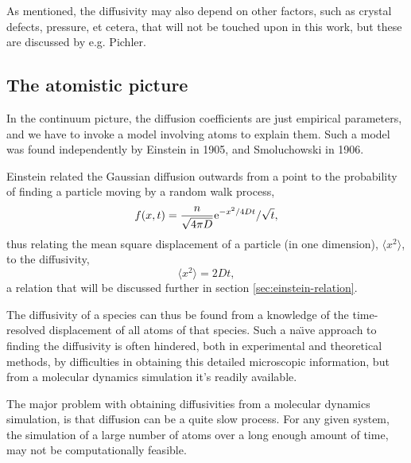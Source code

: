 \documentclass[11pt,bibliography=totoc,index=totoc]{scrbook}   %
\begin{document}
As mentioned, the diffusivity may also depend on other factors, such as crystal defects, pressure, et cetera, that will not be touched upon in this work, but these are discussed by e.g. Pichler.\cite{Pichler:2004}

%
\subsection{The atomistic picture}\label{sec:AtomisticPicture}
%

In the continuum picture, the diffusion coefficients are just empirical parameters, and we have to invoke a model involving atoms to explain them. 
Such a model was found independently by Einstein in 1905,\cite{Einstein:1905} and Smoluchowski in 1906.\cite{Smoluchowski:1906}

Einstein related the Gaussian diffusion outwards from a point to
the probability of finding a particle moving by a random walk process,
\begin{equation}
    f(x,t) = \frac{n}{\sqrt{4\pi D}} \mathrm{e}^{-x^2/4Dt} / \sqrt{t},
\end{equation}
thus relating the mean square displacement of a particle (in one dimension), $\langle x^2 \rangle$, to the diffusivity\cite{Einstein:1905},
\begin{equation}
    \langle x^2\rangle = 2Dt,
    \label{eq:einsteinRelationSimple}
\end{equation}
a relation that will be discussed further in section \ref{sec:einstein-relation}.

The diffusivity of a species can thus be found from a knowledge of the time-resolved displacement of all atoms of that species.
Such a na\"{\i}ve approach to finding the diffusivity is often hindered, both in experimental and theoretical methods, 
by difficulties in obtaining this detailed microscopic information, but from a molecular dynamics simulation it's readily available.

The major problem with obtaining diffusivities from a molecular dynamics simulation, is that diffusion can be a quite slow process.
For any given system, the simulation of a large number of atoms over a long enough amount of time, may not be computationally feasible.

\end{document}
